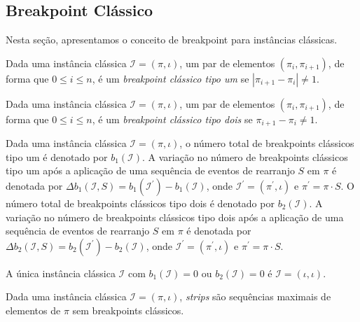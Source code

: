\subsection{Breakpoint Clássico} \label{subsection:POEFMSHU}

Nesta seção, apresentamos o conceito de breakpoint para instâncias clássicas.

\begin{definition}
  Dada uma instância clássica $\mathcal{I} = (\pi,\iota)$, um par de elementos $(\pi_{i}, \pi_{i+1})$, de forma que $0 \le i \le n$, é um \emph{breakpoint clássico tipo um} se $|\pi_{i+1} - \pi_{i}| \ne 1$.
\end{definition}

\begin{definition}
  Dada uma instância clássica $\mathcal{I} = (\pi,\iota)$, um par de elementos $(\pi_{i}, \pi_{i+1})$, de forma que $0 \le i \le n$, é um \emph{breakpoint clássico tipo dois} se $\pi_{i+1} - \pi_{i} \ne 1$.
\end{definition}

Dada uma instância clássica $\mathcal{I} = (\pi,\iota)$, o número total de breakpoints clássicos tipo um é denotado por $b_{1}(\mathcal{I})$. A variação no número de breakpoints clássicos tipo um após a aplicação de uma sequência de eventos de rearranjo $S$ em $\pi$ é denotada por  $\Delta b_1(\mathcal{I},S) = b_1(\mathcal{I}^{\prime}) - b_1(\mathcal{I})$, onde $\mathcal{I}^{\prime} = (\pi^{\prime},\iota)$ e $\pi^{\prime} = \pi \cdot S$. O número total de breakpoints clássicos tipo dois é denotado por $b_{2}(\mathcal{I})$. A variação no número de breakpoints clássicos tipo dois após a aplicação de uma sequência de eventos de rearranjo $S$ em $\pi$ é denotada por $\Delta b_2(\mathcal{I},S) = b_2(\mathcal{I}^{\prime}) - b_2(\mathcal{I})$, onde $\mathcal{I}^{\prime} = (\pi^{\prime},\iota)$ e $\pi^{\prime} = \pi \cdot S$.

\begin{remark}\label{remark:AEYJTIDG}
  A única instância clássica $\mathcal{I}$ com $b_1(\mathcal{I}) = 0$ ou $b_2(\mathcal{I}) = 0$ é $\mathcal{I} = (\iota,\iota)$.
\end{remark}

\begin{definition}
  Dada uma instância clássica $\mathcal{I} = (\pi,\iota)$, \emph{strips} são sequências maximais de elementos de $\pi$ sem breakpoints clássicos.
\end{definition}

